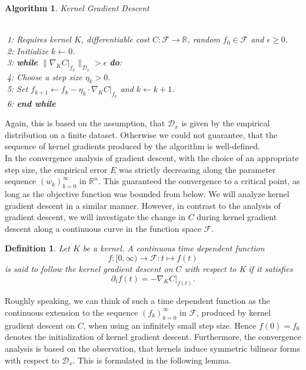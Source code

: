 \documentclass[11pt, a4paper]{article}
\newtheorem{definition}[theorem]{Definition}
\newtheorem{algorithm}[theorem]{Algorithm}
\newcommand{\R}{\mathbb{R}}
\newcommand{\D}{\mathcal{D}}
\newcommand{\F}{\mathcal{F}}
\begin{document}
\begin{algorithm}
\caption{Kernel Gradient Descent \textcolor{white}{$\Big |$}} \ \\
\textcolor{white}{$\Big |$}1: Requires kernel $K$, differentiable cost $C: \F \to \R$, random $f_0 \in \F$ and $\epsilon \geq 0$. \\
\textcolor{white}{$\Big |$}2: Initialize $k \leftarrow 0$. \\
\textcolor{white}{$\Big |$}3: \textbf{while} $\big \| \nabla_K C |_{f_k} \big \|_{\D_x} > \epsilon$ \textbf{do}: \\
\textcolor{white}{$\Big |$}4: \quad Choose a step size $\eta_k > 0$. \\
\textcolor{white}{$\Big |$}5: \quad Set $f_{k+1} \leftarrow f_k - \eta_k \cdot \nabla_ K C |_{f_k}$ and $k \leftarrow k+1$. \\
\textcolor{white}{$\Big |$}6: \textbf{end while}
\end {algorithm}

Again, this is based on the assumption, that  $\D_x$ is given by the empirical distribution on a finite dataset. Otherwise we could not guarantee, that the sequence of kernel gradients produced by the algorithm is well-defined. \\

In the convergence analysis of gradient descent, with the choice of an appropriate step size, the empirical error $E$ was strictly decreasing along the parameter sequence $(w_k)_{k=0}^\infty$ in $\R^n$. This guaranteed the convergence to a critical point, as long as the objective function was bounded from below. We will analyze kernel gradient descent in a similar manner. However, in contrast to the analysis of gradient descent, we will investigate the change in $C$ during kernel gradient descent along a continuous curve in the function space $\F$. 

\begin{definition}
Let $K$ be a kernel. A continuous time dependent function 
\[ f : [0, \infty) \to \F : t \mapsto f(t) \]
is said to follow the kernel gradient descent on $C$ with respect to K if it satisfies
\[ \partial_tf(t) = - \nabla_KC|_{f(t)}. \]
\end{definition}

Roughly speaking, we can think of such a time dependent function as the continuous extension to the sequence $(f_k)_{k=0}^\infty$ in $\F$, produced by kernel gradient descent on $C$, when using an infinitely small step size. Hence $f(0) = f_0$ denotes the initialization of kernel gradient descent. Furthermore, the convergence analysis is based on the observation, that kernels induce symmetric bilinear forms with respect to $\D_x$. This is formulated in the following lemma.
\end{document}
